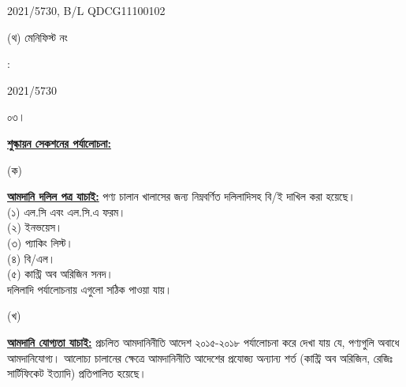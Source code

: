 \documentclass[12pt]{article}
\newcommand{\blno}{QDCG11100102}
\newcommand{\menifest}{2021/5730}
\begin{document}
\begin{minipage}[t]{0.53\linewidth}
{\menifest}, B/L {\blno}
\\
\end{minipage}
\begin{minipage}[t]{0.05\linewidth}
\hspace*{1em}
\end{minipage}
\begin{minipage}[t]{0.40\linewidth}
(থ) মেনিফিস্ট নং
\end{minipage}
\begin{minipage}[t]{0.02\linewidth}
:
\end{minipage}
\begin{minipage}[t]{0.53\linewidth}
{\menifest}
\\
\end{minipage}
\normalsize
\begin{minipage}[t]{0.05\linewidth}
০৩।
\end{minipage}
\begin{minipage}[t]{0.95\linewidth}
\underline{\textbf{শুল্কায়ন সেকশনের পর্যালোচনা:}}
\end{minipage}
\begin{minipage}[t]{0.05\linewidth}
\hspace{1em}
\end{minipage}
\begin{minipage}[t]{0.05\linewidth}
(ক)
\end{minipage}
\begin{minipage}[t]{0.90\linewidth}
\underline{\textbf{আমদানি দলিল পত্র যাচাই:}}
পণ্য চালান খালাসের জন্য নিম্নবর্ণিত দলিলাদিসহ বি/ই দাখিল করা
হয়েছে।
\\
(১) এল.সি এবং এল.সি.এ ফরম।
\\
(২) ইনভয়েস।
\\
(৩) প্যাকিং লিস্ট।
\\
(৪) বি/এল।
\\
(৫) কান্ট্রি অব অরিজিন সনদ।
\\
দলিলাদি পর্যালোচনায় এগুলো
সঠিক পাওয়া যায়।
\\
\end{minipage}
\begin{minipage}[t]{0.05\linewidth}
\hspace{1em}
\end{minipage}
\begin{minipage}[t]{0.05\linewidth}
(খ)
\end{minipage}
\begin{minipage}[t]{0.90\linewidth}
\underline{\textbf{আমদানি যোগ্যতা যাচাই:}}
প্রচলিত আমদানিনীতি আদেশ ২০১৫-২০১৮  পর্যালোচনা করে দেখা যায় যে, পণ্যগুলি অবাধে আমদানিযোগ্য।
আলোচ্য চালানের ক্ষেত্রে আমদানিনীতি আদেশের প্রযোজ্য অন্যান্য শর্ত (কান্ট্রি অব অরিজিন, রেজিঃ
সার্টিফিকেট ইত্যাদি) প্রতিপালিত হয়েছে।
\\
\end{minipage}
\end{document}
